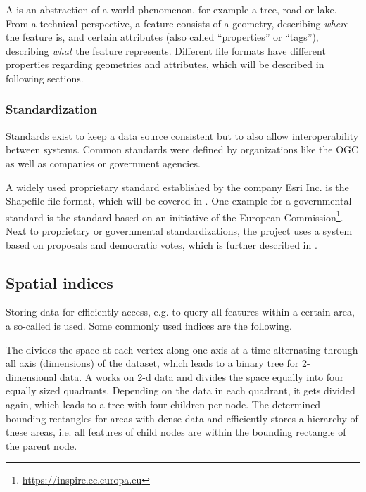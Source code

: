 			A  is an abstraction of a world phenomenon, for example a tree, road or lake.
			From a technical perspective, a feature consists of a geometry, describing \textit{where} the feature is, and certain attributes (also called \enquote{properties} or \enquote{tags}), describing \textit{what} the feature represents.
			Different file formats have different properties regarding geometries and attributes, which will be described in following sections.
		
		\subsubsection{Standardization}
		
			Standards exist to keep a data source consistent but to also allow interoperability between systems.
			Common standards were defined by organizations like the OGC as well as companies or government agencies.
			
			A widely used proprietary standard established by the company Esri Inc. is the Shapefile file format, which will be covered in .
			One example for a governmental standard is the  standard based on an initiative of the European Commission\footnote{\url{https://inspire.ec.europa.eu}}.
			Next to proprietary or governmental standardizations, the  project uses a system based on proposals and democratic votes, which is further described in .
			
		\subsection{Spatial indices}
		
			Storing data for efficiently access, e.g. to query all features within a certain area, a so-called  is used.
			Some commonly used indices are the following.
			
			The \cite[Ch.\ 19,p. 4]{mehta-handbook-data-structures} divides the space at each vertex along one axis at a time alternating through all axis (dimensions) of the dataset, which leads to a binary tree for 2-dimensional data.
			A \cite[Ch.\ 19,p. 1]{mehta-handbook-data-structures} works on 2-d data and divides the space equally into four equally sized quadrants.
			Depending on the data in each quadrant, it gets divided again, which leads to a tree with four children per node.
			The \cite[Ch.\ 21,p. 2]{mehta-handbook-data-structures} determined bounding rectangles for areas with dense data and efficiently stores a hierarchy of these areas, i.e. all features of child nodes are within the bounding rectangle of the parent node.
			
